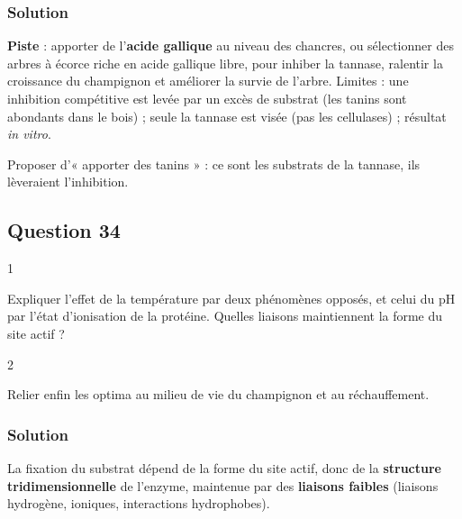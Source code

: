 \documentclass[11pt,a4paper]{article}
\begin{document}
\hypertarget{solution-33}{%
\subsubsection{Solution}\label{solution-33}}

\textbf{Piste} : apporter de l'\textbf{acide gallique} au niveau des chancres, ou sélectionner des arbres à écorce riche en acide gallique libre, pour inhiber la tannase, ralentir la croissance du champignon et améliorer la survie de l'arbre. Limites : une inhibition compétitive est levée par un excès de substrat (les tanins sont abondants dans le bois) ; seule la tannase est visée (pas les cellulases) ; résultat \emph{in vitro}.

\begin{piege}

Proposer d'« apporter des tanins » : ce sont les substrats de la tannase, ils lèveraient l'inhibition.

\end{piege}

\hypertarget{question-34}{%
\subsection{Question 34}\label{question-34}}

\begin{indication}{1}

Expliquer l'effet de la température par deux phénomènes opposés, et celui du pH par l'état d'ionisation de la protéine. Quelles liaisons maintiennent la forme du site actif ?

\end{indication}

\begin{indication}{2}

Relier enfin les optima au milieu de vie du champignon et au réchauffement.

\end{indication}

\hypertarget{solution-34}{%
\subsubsection{Solution}\label{solution-34}}

La fixation du substrat dépend de la forme du site actif, donc de la \textbf{structure tridimensionnelle} de l'enzyme, maintenue par des \textbf{liaisons faibles} (liaisons hydrogène, ioniques, interactions hydrophobes).
\end{document}
